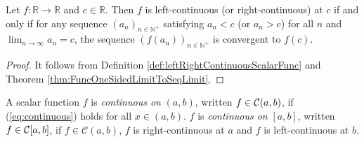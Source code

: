 \begin{thm}
  \label{thm:OneSidedContinuousEquivOneSidedSeqLimit}
  Let $f:\mathbb{R}\rightarrow \mathbb{R}$
  and $c\in \mathbb{R}$.
  Then $f$ is left-continuous (or right-continuous) at $c$ if and only if
  for any sequence $(a_{n})_{n\in \mathbb{N}^{+}}$ satisfying
  $a_{n}< c$ (or $a_{n}>c$) for all $n$ and
  $\lim_{n\rightarrow\infty}a_{n}=c$, the sequence
  $(f(a_{n}))_{n\in \mathbb{N}^{+}}$ is convergent to $f(c)$.
\end{thm}
\begin{proof}
  It follows from Definition \ref{def:leftRightContinuousScalarFunc}
  and Theorem \ref{thm:FuncOneSidedLimitToSeqLimit}.
\end{proof}

\begin{defn}
  \label{def:continuousFuncOnR}
  A scalar function $f$ is \emph{continuous on} $(a,b)$,
     written \mbox{$f\in{\cal C}(a,b)$}, 
     if (\ref{eq:continuous}) holds for all $ x\in (a,b)$.
     $f$ is \emph{continuous on} $[a,b]$,
     written \mbox{$f\in{\cal C}[a,b]$},
     if $f\in \mathcal{C}(a,b)$,
     $f$ is right-continuous at $a$ and $f$ is left-continuous
     at $b$.
\end{defn}
   

